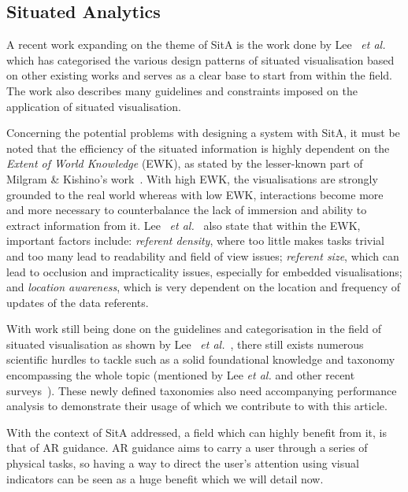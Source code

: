 \subsection{Situated Analytics}

A recent work expanding on the theme of SitA is the work done by Lee ~\textit{et al.}~\cite{lee2023design} which has categorised the various design patterns of situated visualisation based on other existing works and serves as a clear base to start from within the field. The work also describes many guidelines and constraints imposed on the application of situated visualisation.

Concerning the potential problems with designing a system with SitA, it must be noted that the efficiency of the situated information is highly dependent on the \textit{Extent of World Knowledge} (EWK), as stated by the lesser-known part of Milgram \& Kishino's work~\cite{milgram1994taxonomy}. 
With high EWK, the visualisations are strongly grounded to the real world whereas with low EWK, interactions become more and more necessary to counterbalance the lack of immersion and ability to extract information from it. 
Lee ~\textit{et al.}~\cite{lee2023design} also state that within the EWK, important factors include: \textit{referent density}, where too little makes tasks trivial and too many lead to readability and field of view issues; \textit{referent size}, which can lead to occlusion and impracticality issues, especially for embedded visualisations; and \textit{location awareness}, which is very dependent on the location and frequency of updates of the data referents.

With work still being done on the guidelines and categorisation in the field of situated visualisation as shown by Lee ~\textit{et al.}~\cite{lee2023design}, there still exists numerous scientific hurdles to tackle such as a solid foundational knowledge and taxonomy encompassing the whole topic (mentioned by Lee \textit{et al.} and other recent surveys~\cite{bressa2021s,satriadi2023proxsituated,shin2023reality}).
These newly defined taxonomies also need accompanying performance analysis to demonstrate their usage of which we contribute to with this article.

With the context of SitA addressed, a field which can highly benefit from it, is that of AR guidance. AR guidance aims to carry a user through a series of physical tasks, so having a way to direct the user's attention using visual indicators can be seen as a huge benefit which we will detail now.

